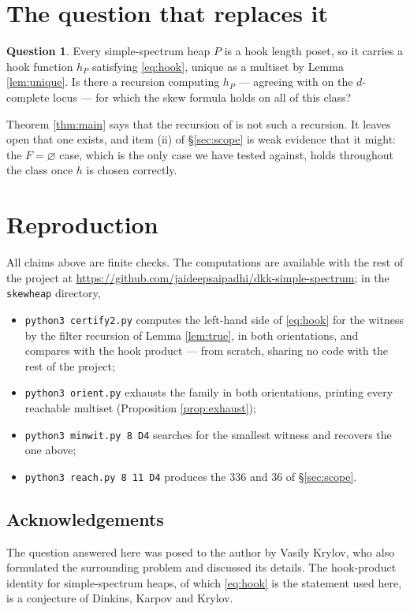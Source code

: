 \documentclass[reqno]{amsart}
\theoremstyle{plain}
\theoremstyle{definition}
\newtheorem{question}[theorem]{Question}
\begin{document}
\section{The question that replaces it}\label{sec:open}

\begin{question}\label{q:new}
Every simple-spectrum heap $P$ is a hook length poset, so it carries a hook
function $h_P$ satisfying \eqref{eq:hook}, unique as a multiset by Lemma
\ref{lem:unique}.  Is there a recursion computing $h_P$ --- agreeing with
\cite[Def.~2.6]{NO} on the $d$-complete locus --- for which the skew formula
\cite[Thm.~1.2]{NO} holds on all of this class?
\end{question}

Theorem \ref{thm:main} says that the recursion of \cite[Def.~2.6]{NO} is not
such a recursion.  It leaves open that one exists, and item (ii) of
\S\ref{sec:scope} is weak evidence that it might: the $F=\varnothing$ case,
which is the only case we have tested against, holds throughout the class once
$h$ is chosen correctly.

\section{Reproduction}

All claims above are finite checks.  The computations are available with the
rest of the project at
\url{https://github.com/jaideepsaipadhi/dkk-simple-spectrum}; in the
\texttt{skewheap} directory,
\begin{itemize}
\item \verb|python3 certify2.py| computes the left-hand side of
\eqref{eq:hook} for the witness by the filter recursion of Lemma
\ref{lem:true}, in both orientations, and compares with the hook product ---
from scratch, sharing no code with the rest of the project;
\item \verb|python3 orient.py| exhausts the \cite[Def.~2.6]{NO} family in both
orientations, printing every reachable multiset (Proposition
\ref{prop:exhaust});
\item \verb|python3 minwit.py 8 D4| searches for the smallest witness and
recovers the one above;
\item \verb|python3 reach.py 8 11 D4| produces the $336$ and $36$ of
\S\ref{sec:scope}.
\end{itemize}

\subsection*{Acknowledgements}
The question answered here was posed to the author by Vasily Krylov, who also
formulated the surrounding problem and discussed its details.  The
hook-product identity for simple-spectrum heaps, of which \eqref{eq:hook} is
the statement used here, is a conjecture of Dinkins, Karpov and Krylov.
\end{document}
